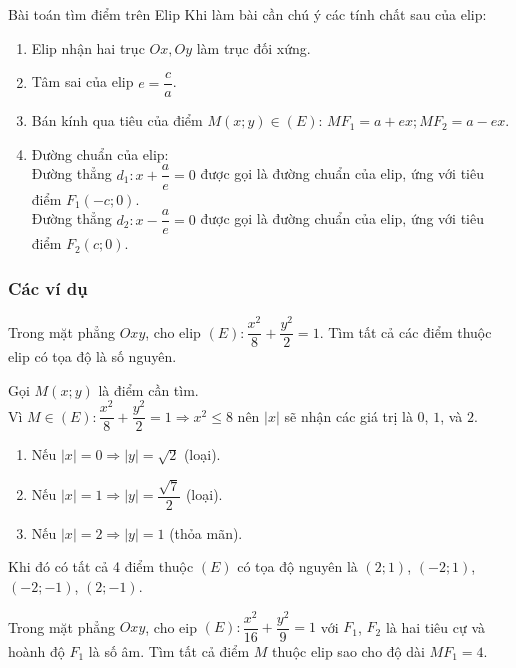 \begin{dang}{Bài toán tìm điểm trên Elip}
	Khi làm bài cần chú ý các tính chất sau của elip:
\begin{enumerate}
	\item Elip nhận hai trục $Ox,Oy$ làm trục đối xứng. 
	\item Tâm sai của elip $e=\dfrac{c}{a}$.
	\item Bán kính qua tiêu của điểm $M(x;y)\in (E)$: $MF_1=a+ex; MF_2=a-ex$.
	\item Đường chuẩn của elip:\\Đường thẳng $d_1: x+\dfrac{a}{e}=0$ được gọi là đường chuẩn của elip, ứng với tiêu điểm $F_1(-c;0)$.\\Đường thẳng $d_2: x-\dfrac{a}{e}=0$ được gọi là đường chuẩn của elip, ứng với tiêu điểm $F_2(c;0).$      
\end{enumerate}
\end{dang}

\subsubsection{Các ví dụ}
\begin{vd}%
Trong mặt phẳng $Oxy$, cho elip $(E)\colon \dfrac{x^2}{8}+\dfrac{y^2}{2}=1$. Tìm tất cả các điểm thuộc elip có tọa độ là số nguyên.
\loigiai
{Gọi $M(x;y)$ là điểm cần tìm.\\
Vì $M\in (E)\colon \dfrac{x^2}{8}+\dfrac{y^2}{2}=1 \Rightarrow x^2\le 8$ nên $|x|$ sẽ nhận các giá trị là $0$, $1$, và $2$.
\begin{enumerate}[$\bullet$]
	\item Nếu $|x|=0\Rightarrow |y|=\sqrt{2}$ (loại).
	\item Nếu $|x|=1\Rightarrow |y|=\dfrac{\sqrt{7}}{2}$ (loại).
	\item Nếu $|x|=2 \Rightarrow |y|=1$ (thỏa mãn).
\end{enumerate}	
Khi đó có tất cả 4 điểm thuộc $(E)$ có tọa độ nguyên là $(2;1)$, $(-2;1)$, $(-2;-1)$, $(2;-1)$.
}
\end{vd}

\begin{vd}%
Trong mặt phẳng $Oxy$, cho eip $(E)\colon \dfrac{x^2}{16}+\dfrac{y^2}{9}=1$ với $F_1$, $F_2$ là hai tiêu cự và hoành độ $F_1$ là số âm. Tìm tất cả điểm $M$ thuộc elip sao cho độ dài $MF_1=4$.
\end{vd}

